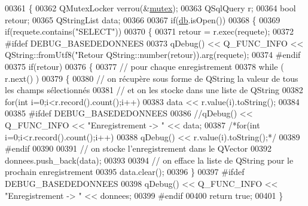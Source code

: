 \begin{DoxyCode}
00361 \{
00362     QMutexLocker verrou(&\hyperlink{class_base_de_donnees_aa1b4696fac87a740f914aa73739086f2}{mutex});
00363     QSqlQuery r;
00364     \textcolor{keywordtype}{bool} retour;
00365     QStringList data;
00366 
00367     \textcolor{keywordflow}{if}(\hyperlink{class_base_de_donnees_a3e738dcf443370c46a541677ab619f06}{db}.isOpen())
00368     \{
00369         \textcolor{keywordflow}{if}(requete.contains(\textcolor{stringliteral}{"SELECT"}))
00370         \{
00371             retour = r.exec(requete);
00372 \textcolor{preprocessor}{            #ifdef DEBUG\_BASEDEDONNEES}
00373             qDebug() << Q\_FUNC\_INFO << QString::fromUtf8(\textcolor{stringliteral}{"Retour %
      QString::number(retour)).arg(requete);
00374 \textcolor{preprocessor}{            #endif}
00375             \textcolor{keywordflow}{if}(retour)
00376             \{
00377                 \textcolor{comment}{// pour chaque enregistrement}
00378                 \textcolor{keywordflow}{while} ( r.next() )
00379                 \{
00380                     \textcolor{comment}{// on récupère sous forme de QString la valeur de tous les champs sélectionnés}
00381                     \textcolor{comment}{// et on les stocke dans une liste de QString}
00382                     \textcolor{keywordflow}{for}(\textcolor{keywordtype}{int} i=0;i<r.record().count();i++)
00383                         data << r.value(i).toString();
00384 
00385 \textcolor{preprocessor}{                    #ifdef DEBUG\_BASEDEDONNEES}
00386                     \textcolor{comment}{//qDebug() << Q\_FUNC\_INFO << "Enregistrement -> " << data;}
00387                     \textcolor{comment}{/*for(int i=0;i<r.record().count();i++)}
00388 \textcolor{comment}{                        qDebug() << r.value(i).toString();*/}
00389 \textcolor{preprocessor}{                    #endif}
00390 
00391                     \textcolor{comment}{// on stocke l'enregistrement dans le QVector}
00392                     donnees.push\_back(data);
00393 
00394                     \textcolor{comment}{// on efface la liste de QString pour le prochain enregistrement}
00395                     data.clear();
00396                 \}
00397 \textcolor{preprocessor}{                #ifdef DEBUG\_BASEDEDONNEES}
00398                 qDebug() << Q\_FUNC\_INFO << \textcolor{stringliteral}{"Enregistrement -> "} << donnees;
00399 \textcolor{preprocessor}{                #endif}
00400                 \textcolor{keywordflow}{return} \textcolor{keyword}{true};
00401             \}
}
\end{DoxyCode}
